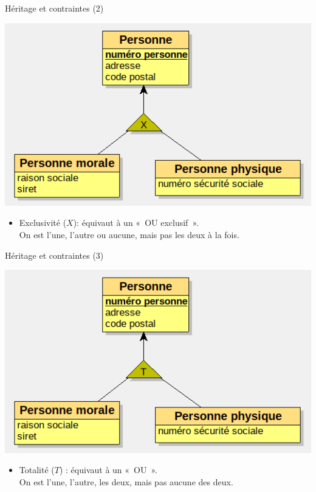 \begin{framentitle}{Héritage et contraintes (2)}
    \begin{center}
    \includegraphics[width=.8\textwidth]{heritage_x.png}
    \end{center}
    \begin{itemize}
        \item Exclusivité ($X$): équivaut à un «~OU exclusif~».\\On est l'une,
            l'autre ou aucune, mais pas les deux à la fois.
    \end{itemize}
\end{framentitle}

\begin{framentitle}{Héritage et contraintes (3)}
    \begin{center}
    \includegraphics[width=.8\textwidth]{heritage_t.png}
    \end{center}
    \begin{itemize}
        \item Totalité ($T$) : équivaut à un «~OU~».\\On est l'une, l'autre, les
            deux, mais pas aucune des deux.
    \end{itemize}
\end{framentitle}

